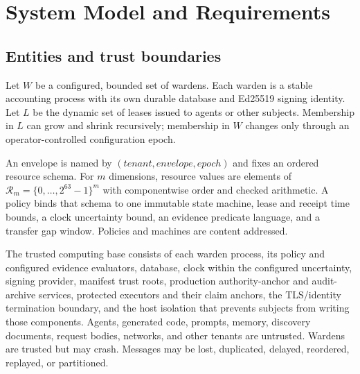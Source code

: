 \documentclass[10pt]{article}
\begin{document}
\section{System Model and Requirements}

\subsection{Entities and trust boundaries}

Let $W$ be a configured, bounded set of wardens. Each warden is a stable accounting process with
its own durable database and Ed25519 signing identity. Let $L$ be the dynamic set of leases issued
to agents or other subjects. Membership in $L$ can grow and shrink recursively; membership in $W$
changes only through an operator-controlled configuration epoch.

An envelope is named by $(tenant, envelope, epoch)$ and fixes an ordered resource schema. For
$m$ dimensions, resource values are elements of
$\mathcal{R}_m = \{0,\ldots,2^{63}-1\}^m$ with componentwise order and checked arithmetic. A
policy binds that schema to one immutable state machine, lease and receipt time bounds, a clock
uncertainty bound, an evidence predicate language, and a transfer gap window. Policies and
machines are content addressed.

The trusted computing base consists of each warden process, its policy and configured evidence
evaluators, database, clock within the configured uncertainty, signing provider, manifest trust
roots, production authority-anchor and audit-archive services, protected executors and their
claim anchors, the TLS/identity termination boundary, and the host isolation that prevents
subjects from writing those components.
Agents, generated code, prompts, memory, discovery documents, request bodies, networks, and other
tenants are untrusted. Wardens are trusted but may crash. Messages may be lost, duplicated,
delayed, reordered, replayed, or partitioned.
\end{document}
